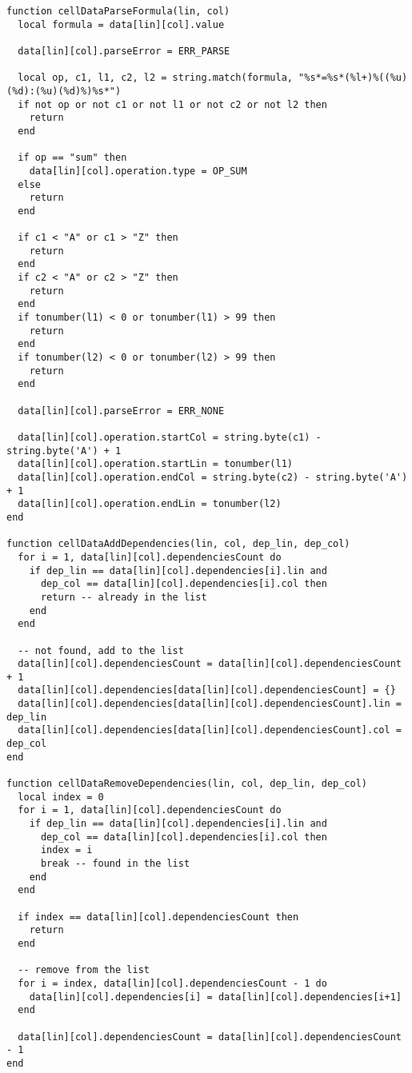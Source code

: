 \documentclass{ctexart}
\begin{document}
\begin{lstlisting}
function cellDataParseFormula(lin, col)
  local formula = data[lin][col].value

  data[lin][col].parseError = ERR_PARSE

  local op, c1, l1, c2, l2 = string.match(formula, "%s*=%s*(%l+)%((%u)(%d):(%u)(%d)%)%s*")
  if not op or not c1 or not l1 or not c2 or not l2 then
    return
  end

  if op == "sum" then
    data[lin][col].operation.type = OP_SUM
  else
    return
  end

  if c1 < "A" or c1 > "Z" then
    return
  end
  if c2 < "A" or c2 > "Z" then
    return
  end
  if tonumber(l1) < 0 or tonumber(l1) > 99 then
    return
  end
  if tonumber(l2) < 0 or tonumber(l2) > 99 then
    return
  end

  data[lin][col].parseError = ERR_NONE
  
  data[lin][col].operation.startCol = string.byte(c1) - string.byte('A') + 1
  data[lin][col].operation.startLin = tonumber(l1)
  data[lin][col].operation.endCol = string.byte(c2) - string.byte('A') + 1
  data[lin][col].operation.endLin = tonumber(l2)
end

function cellDataAddDependencies(lin, col, dep_lin, dep_col)
  for i = 1, data[lin][col].dependenciesCount do
    if dep_lin == data[lin][col].dependencies[i].lin and 
      dep_col == data[lin][col].dependencies[i].col then
      return -- already in the list
    end
  end

  -- not found, add to the list
  data[lin][col].dependenciesCount = data[lin][col].dependenciesCount + 1
  data[lin][col].dependencies[data[lin][col].dependenciesCount] = {}
  data[lin][col].dependencies[data[lin][col].dependenciesCount].lin = dep_lin
  data[lin][col].dependencies[data[lin][col].dependenciesCount].col = dep_col
end

function cellDataRemoveDependencies(lin, col, dep_lin, dep_col)
  local index = 0
  for i = 1, data[lin][col].dependenciesCount do
    if dep_lin == data[lin][col].dependencies[i].lin and
      dep_col == data[lin][col].dependencies[i].col then
      index = i
      break -- found in the list
    end
  end

  if index == data[lin][col].dependenciesCount then
    return
  end

  -- remove from the list
  for i = index, data[lin][col].dependenciesCount - 1 do
    data[lin][col].dependencies[i] = data[lin][col].dependencies[i+1]
  end
  
  data[lin][col].dependenciesCount = data[lin][col].dependenciesCount - 1
end


\end{lstlisting}
\end{document}
